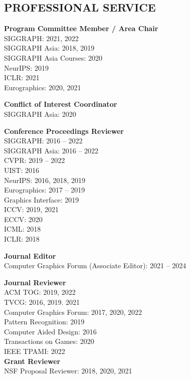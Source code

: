 \documentclass[line,margin]{res}
\begin{document}
\begin{resume}

\section{PROFESSIONAL SERVICE}

\textbf{Program Committee Member / Area Chair}\\
SIGGRAPH: 2021, 2022\\
SIGGRAPH Asia: 2018, 2019\\
SIGGRAPH Asia Courses: 2020\\
NeurIPS: 2019\\
ICLR: 2021\\
Eurographics: 2020, 2021

\textbf{Conflict of Interest Coordinator}\\
SIGGRAPH Asia: 2020

\textbf{Conference Proceedings Reviewer}\\
SIGGRAPH: 2016 -- 2022\\
SIGGRAPH Asia: 2016 -- 2022\\
CVPR: 2019 -- 2022\\
UIST: 2016\\
NeurIPS: 2016, 2018, 2019\\
Eurographics: 2017 --  2019\\
Graphics Interface: 2019\\
ICCV: 2019, 2021\\
ECCV: 2020\\
ICML: 2018\\
ICLR: 2018

\textbf{Journal Editor}\\
Computer Graphics Forum (Associate Editor): 2021 -- 2024

\textbf{Journal Reviewer}\\
ACM TOG: 2019, 2022\\
TVCG: 2016, 2019. 2021\\
Computer Graphics Forum: 2017, 2020, 2022\\
Pattern Recognition: 2019\\
Computer Aided Design: 2016\\
Transactions on Games: 2020\\
IEEE TPAMI: 2022\\

\textbf{Grant Reviewer}\\
NSF Proposal Reviewer: 2018, 2020, 2021



\end{resume}
\end{document}
